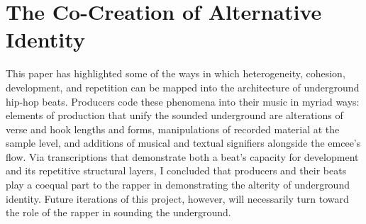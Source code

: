 \section{The Co-Creation of Alternative Identity}
This paper has highlighted some of the ways in which heterogeneity, cohesion, development, and repetition can be mapped into the architecture of underground hip-hop beats. Producers code these phenomena into their music in myriad ways: elements of production that unify the sounded underground are alterations of verse and hook lengths and forms, manipulations of recorded material at the sample level, and additions of musical and textual signifiers alongside the emcee's flow. Via transcriptions that demonstrate both a beat's capacity for development and its repetitive structural layers, I concluded that producers and their beats play a coequal part to the rapper in demonstrating the alterity of underground identity. Future iterations of this project, however, will necessarily turn toward the role of the rapper in sounding the underground.